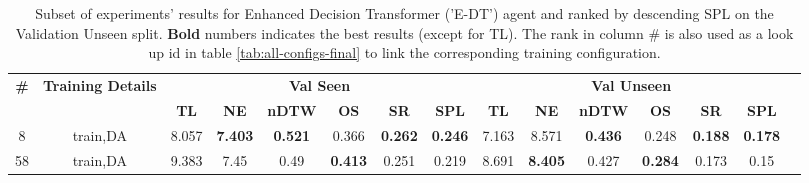 \begin{table}
\centering
\caption{\label{tab:e_dt_dagger}Subset of experiments' results for Enhanced Decision Transformer ('E-DT') agent and ranked by descending SPL on the Validation Unseen split. \textbf{Bold} numbers indicates the best results (except for TL). The rank in column \# is also used as a look up id in table \ref{tab:all-configs-final} to link the corresponding training configuration.}
\begin{tabular}{@{\hskip3pt}c@{\hskip3pt}c@{\hskip3pt}c@{\hskip3pt}c@{\hskip3pt}c@{\hskip3pt}c@{\hskip3pt}c@{\hskip3pt}c@{\hskip3pt}c@{\hskip3pt}c@{\hskip3pt}c@{\hskip3pt}c@{\hskip3pt}c@{\hskip3pt}c@{\hskip3pt}c}
\toprule
                                  \textbf{\#} & \textbf{Training Details} & \multicolumn{6}{c}{\textbf{Val Seen}} & \multicolumn{6}{c}{\textbf{Val Unseen}} \\
\cmidrule(l){3-8}\cmidrule(l){9-14}\textbf{~} &                \textbf{~} &       \textbf{TL} &     \textbf{NE} &   \textbf{nDTW} &     \textbf{OS} &     \textbf{SR} &    \textbf{SPL} &         \textbf{TL} &     \textbf{NE} &   \textbf{nDTW} &     \textbf{OS} &     \textbf{SR} &    \textbf{SPL} \\
\midrule
                                            8 &                  train,DA &             8.057 &  \textbf{7.403} &  \textbf{0.521} &           0.366 &  \textbf{0.262} &  \textbf{0.246} &               7.163 &           8.571 &  \textbf{0.436} &           0.248 &  \textbf{0.188} &  \textbf{0.178} \\
                                           58 &                  train,DA &             9.383 &            7.45 &            0.49 &  \textbf{0.413} &           0.251 &           0.219 &               8.691 &  \textbf{8.405} &           0.427 &  \textbf{0.284} &           0.173 &            0.15 \\
\bottomrule
\end{tabular}
\end{table}
